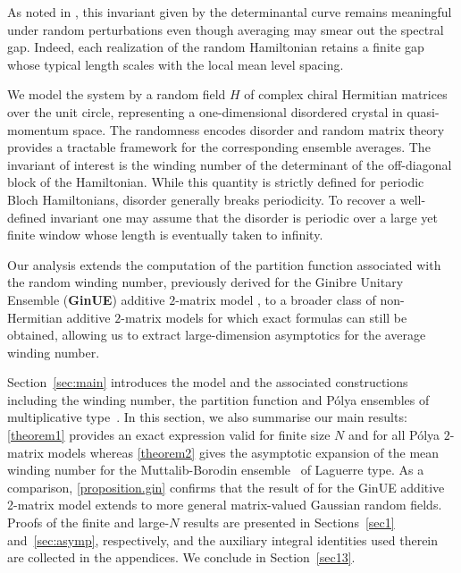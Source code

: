 \documentclass[pdflatex,sn-mathphys-num]{sn-jnl}
\theoremstyle{thmstyleone}
\numberwithin{equation}{section}
\begin{document}
As noted in \cite{braunWindingNumberStatistics2022,hahnUniversalCorrelations2024}, this invariant given by the determinantal curve remains meaningful under random perturbations even though averaging may smear out the spectral gap. Indeed, each realization of the random Hamiltonian retains a finite gap whose typical length scales with the local mean level spacing.


We model the system by a random field $H$ of complex chiral Hermitian matrices over the unit circle, representing a one-dimensional disordered crystal in quasi-momentum space. The randomness encodes disorder and random matrix theory provides a tractable framework for the corresponding ensemble averages. The invariant of interest is the winding number of the determinant of the off-diagonal block of the Hamiltonian. While this quantity is strictly defined for periodic Bloch Hamiltonians, disorder generally breaks periodicity. To recover a well-defined invariant one may assume that the disorder is periodic over a large yet finite window whose length is eventually taken to infinity.

Our analysis extends the computation of the partition function associated with the random winding number, previously derived for the Ginibre Unitary Ensemble (\textbf{GinUE}) additive $2$-matrix model \cite{braunWindingNumberStatistics2022,hahnWindingNumberStatistics2023,hahnUniversalCorrelations2024}, to a broader class of non-Hermitian additive $2$-matrix models for which exact formulas can still be obtained, allowing us to extract large-dimension asymptotics for the average winding number.

Section~\ref{sec:main} introduces the model and the associated constructions including the winding number, the partition function and P\'olya ensembles of multiplicative type~\cite{kieburgExactRelationSingular2016,kieburgProductsRandomMatrices2019,forsterPolynomialEnsemblesPolya2021}. In this section, we also summarise our main results: \autoref{theorem1} provides an exact expression valid for finite size $N$ and for all P\'olya $2$-matrix models whereas \autoref{theorem2} gives the asymptotic expansion of the mean winding number for the Muttalib-Borodin ensemble~\cite{borodinBiorthogonalEnsembles1998} of Laguerre type. As a comparison, \autoref{proposition.gin} confirms that the result of \cite{braunWindingNumberStatistics2022,hahnWindingNumberStatistics2023} for the GinUE additive 2-matrix model extends to more general matrix-valued Gaussian random fields. Proofs of the finite and large-$N$ results are presented in Sections~\ref{sec1} and~\ref{sec:asymp}, respectively, and the auxiliary integral identities used therein are collected in the appendices. We conclude in Section~\ref{sec13}.
\end{document}
